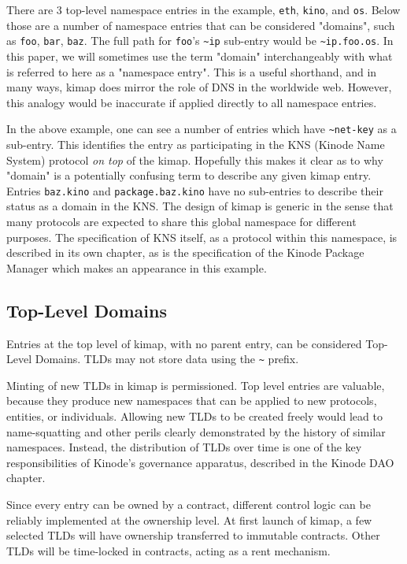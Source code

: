 \documentclass[runningheads]{llncs}
\begin{document}
There are 3 top-level namespace entries in the example, \verb|eth|, \verb|kino|, and \verb|os|.
Below those are a number of namespace entries that can be considered "domains", such as \verb|foo|, \verb|bar|, \verb|baz|.
The full path for \verb|foo|'s \verb|~ip| sub-entry would be \verb|~ip.foo.os|.
In this paper, we will sometimes use the term "domain" interchangeably with what is referred to here as a "namespace entry".
This is a useful shorthand, and in many ways, kimap does mirror the role of DNS in the worldwide web.
However, this analogy would be inaccurate if applied directly to all namespace entries.

In the above example, one can see a number of entries which have \verb|~net-key| as a sub-entry.
This identifies the entry as participating in the KNS (Kinode Name System) protocol \textit{on top} of the kimap.
Hopefully this makes it clear as to why "domain" is a potentially confusing term to describe any given kimap entry.
Entries \verb|baz.kino| and \verb|package.baz.kino| have no sub-entries to describe their status as a domain in the KNS.
The design of kimap is generic in the sense that many protocols are expected to share this global namespace for different purposes.
The specification of KNS itself, as a protocol within this namespace, is described in its own chapter, as is the specification of the Kinode Package Manager which makes an appearance in this example.

\subsection{Top-Level Domains}

Entries at the top level of kimap, with no parent entry, can be considered Top-Level Domains.
TLDs may not store data using the \verb|~| prefix.

Minting of new TLDs in kimap is permissioned.
Top level entries are valuable, because they produce new namespaces that can be applied to new protocols, entities, or individuals.
Allowing new TLDs to be created freely would lead to name-squatting and other perils clearly demonstrated by the history of similar namespaces.
Instead, the distribution of TLDs over time is one of the key responsibilities of Kinode's governance apparatus, described in the Kinode DAO chapter.

Since every entry can be owned by a contract, different control logic can be reliably implemented at the ownership level.
At first launch of kimap, a few selected TLDs will have ownership transferred to immutable contracts.
Other TLDs will be time-locked in contracts, acting as a rent mechanism.
\end{document}
